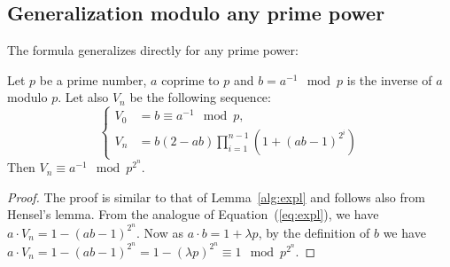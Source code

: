 \subsection{Generalization modulo any prime power}
The formula generalizes directly for any prime power:
\begin{theorem}
Let $p$ be a prime number, $a$ coprime to $p$ and $b=a^{-1} \mod p$ is the
inverse of $a$ modulo $p$.
Let also $V_n$ be the following sequence:
\begin{equation}
\begin{cases}
V_0 &= b \equiv a^{-1} \mod p,\\
V_n &= b(2-ab)\prod_{i=1}^{n-1}\left(1+(ab-1)^{2^i}\right)
\end{cases}
\end{equation}
Then $V_n \equiv a^{-1} \mod p^{2^n}$.
\end{theorem}
\begin{proof}
The proof is similar to that of Lemma~\ref{alg:expl} and follows also from
Hensel's lemma.
From the analogue of Equation~(\ref{eq:expl}), we have $a\cdot
V_n=1-(ab-1)^{2^n}$. 
Now as $a\cdot b = 1 + \lambda p$, by the definition of $b$ we have 
$a\cdot V_n=1-(ab-1)^{2^n} = 1 - (\lambda p)^{2^n} \equiv 1 \mod p^{2^n}$. 
\end{proof}


